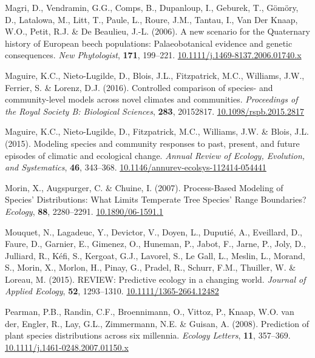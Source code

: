 \documentclass[11pt,]{article}
\newlength{\cslhangindent}
\newenvironment{CSLReferences}[2] %
 {%
  \setlength{\parindent}{0pt}
  \ifodd #1 \everypar{\setlength{\hangindent}{\cslhangindent}}\ignorespaces\fi
  \ifnum #2 > 0
  \setlength{\parskip}{#2\baselineskip}
  \fi
 }%
 {}
\begin{document}
\begin{CSLReferences}{1}{0}
\leavevmode{}%
Magri, D., Vendramin, G.G., Comps, B., Dupanloup, I., Geburek, T.,
Gömöry, D., Latalowa, M., Litt, T., Paule, L., Roure, J.M., Tantau, I.,
Van Der Knaap, W.O., Petit, R.J. \& De Beaulieu, J.-L. (2006). A new
scenario for the {Quaternary} history of {European} beech populations:
Palaeobotanical evidence and genetic consequences. \emph{New
Phytologist}, \textbf{171}, 199--221.
\href{https://doi.org/10.1111/j.1469-8137.2006.01740.x}{10.1111/j.1469-8137.2006.01740.x}

\leavevmode{}%
Maguire, K.C., Nieto-Lugilde, D., Blois, J.L., Fitzpatrick, M.C.,
Williams, J.W., Ferrier, S. \& Lorenz, D.J. (2016). Controlled
comparison of species- and community-level models across novel climates
and communities. \emph{Proceedings of the Royal Society B: Biological
Sciences}, \textbf{283}, 20152817.
\href{https://doi.org/10.1098/rspb.2015.2817}{10.1098/rspb.2015.2817}

\leavevmode{}%
Maguire, K.C., Nieto-Lugilde, D., Fitzpatrick, M.C., Williams, J.W. \&
Blois, J.L. (2015). Modeling species and community responses to past,
present, and future episodes of climatic and ecological change.
\emph{Annual Review of Ecology, Evolution, and Systematics},
\textbf{46}, 343--368.
\href{https://doi.org/10.1146/annurev-ecolsys-112414-054441}{10.1146/annurev-ecolsys-112414-054441}

\leavevmode{}%
Morin, X., Augspurger, C. \& Chuine, I. (2007). Process-{Based}
{Modeling} of {Species}' {Distributions}: {What} {Limits} {Temperate}
{Tree} {Species}' {Range} {Boundaries}? \emph{Ecology}, \textbf{88},
2280--2291. \href{https://doi.org/10.1890/06-1591.1}{10.1890/06-1591.1}

\leavevmode{}%
Mouquet, N., Lagadeuc, Y., Devictor, V., Doyen, L., Duputié, A.,
Eveillard, D., Faure, D., Garnier, E., Gimenez, O., Huneman, P., Jabot,
F., Jarne, P., Joly, D., Julliard, R., Kéfi, S., Kergoat, G.J., Lavorel,
S., Le Gall, L., Meslin, L., Morand, S., Morin, X., Morlon, H., Pinay,
G., Pradel, R., Schurr, F.M., Thuiller, W. \& Loreau, M. (2015).
{REVIEW}: {Predictive} ecology in a changing world. \emph{Journal of
Applied Ecology}, \textbf{52}, 1293--1310.
\href{https://doi.org/10.1111/1365-2664.12482}{10.1111/1365-2664.12482}

\leavevmode{}%
Pearman, P.B., Randin, C.F., Broennimann, O., Vittoz, P., Knaap, W.O.
van der, Engler, R., Lay, G.L., Zimmermann, N.E. \& Guisan, A. (2008).
Prediction of plant species distributions across six millennia.
\emph{Ecology Letters}, \textbf{11}, 357--369.
\href{https://doi.org/10.1111/j.1461-0248.2007.01150.x}{10.1111/j.1461-0248.2007.01150.x}


\end{CSLReferences}
\end{document}
